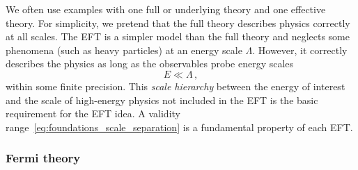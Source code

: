 We often use examples with one full or underlying theory and
one effective theory. For simplicity, we pretend that the full theory
describes physics correctly at all scales. The EFT is a simpler model
than the full theory and neglects some phenomena (such as heavy
particles) at an energy scale $\Lambda$. However, it correctly describes
the physics as long as the observables probe energy scales
%
\begin{equation}
  E \ll \Lambda \,,
  \label{eq:foundations_scale_separation}
\end{equation}
%
within some finite precision. This \emph{scale hierarchy} between the
energy of interest and the scale of high-energy physics not included
in the EFT is the basic requirement for the EFT idea. A validity
range~\eqref{eq:foundations_scale_separation} is a fundamental property of each
EFT.





\subsubsection{Fermi theory}


